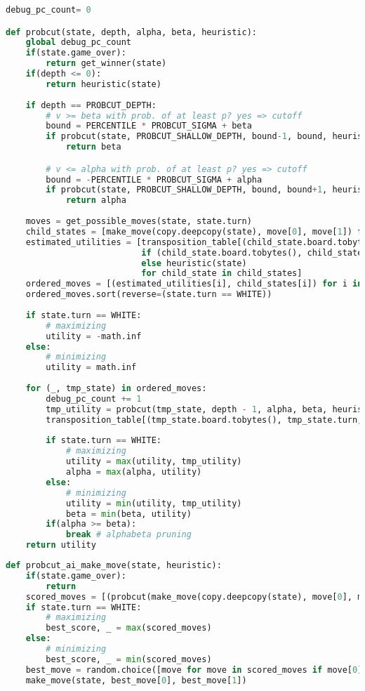\begin{lstlisting}[language=Python]
debug_pc_count= 0

def probcut(state, depth, alpha, beta, heuristic):
    global debug_pc_count
    if(state.game_over):
        return get_winner(state)
    if(depth <= 0):
        return heuristic(state)
    
    if depth == PROBCUT_DEPTH:
        # v >= beta with prob. of at least p? yes => cutoff
        bound = PERCENTILE * PROBCUT_SIGMA + beta
        if probcut(state, PROBCUT_SHALLOW_DEPTH, bound-1, bound, heuristic) >= bound:
            return beta

        # v <= alpha with prob. of at least p? yes => cutoff
        bound = -PERCENTILE * PROBCUT_SIGMA + alpha
        if probcut(state, PROBCUT_SHALLOW_DEPTH, bound, bound+1, heuristic) <= bound:
            return alpha
    
    moves = get_possible_moves(state, state.turn)
    child_states = [make_move(copy.deepcopy(state), move[0], move[1]) for move in moves]
    estimated_utilities = [transposition_table[(child_state.board.tobytes(), child_state.turn, heuristic)]
                           if (child_state.board.tobytes(), child_state.turn, heuristic) in transposition_table
                           else heuristic(state)
                           for child_state in child_states]
    ordered_moves = [(estimated_utilities[i], child_states[i]) for i in range(len(moves))]
    ordered_moves.sort(reverse=(state.turn == WHITE))
    
    if state.turn == WHITE:
        # maximizing
        utility = -math.inf
    else:
        # minimizing
        utility = math.inf
        
    for (_, tmp_state) in ordered_moves:
        debug_pc_count += 1
        tmp_utility = probcut(tmp_state, depth - 1, alpha, beta, heuristic)
        transposition_table[(tmp_state.board.tobytes(), tmp_state.turn, heuristic)] = tmp_utility
        
        if state.turn == WHITE:
            # maximizing
            utility = max(utility, tmp_utility)
            alpha = max(alpha, utility)
        else:
            # minimizing
            utility = min(utility, tmp_utility)
            beta = min(beta, utility)
        if(alpha >= beta):
            break # alphabeta pruning
    return utility
\end{lstlisting}

\begin{lstlisting}[language=Python]
def probcut_ai_make_move(state, heuristic):
    if(state.game_over):
        return
    scored_moves = [(probcut(make_move(copy.deepcopy(state), move[0], move[1]), PROBCUT_DEPTH-1, -math.inf, math.inf, heuristic), move) for move in state.possible_moves]
    if state.turn == WHITE:
        # maximizing
        best_score, _ = max(scored_moves)
    else:
        # minimizing
        best_score, _ = min(scored_moves)
    best_move = random.choice([move for move in scored_moves if move[0] == best_score])[1]
    make_move(state, best_move[0], best_move[1])
\end{lstlisting}

